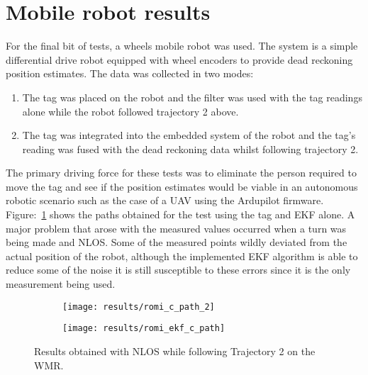 \section{Mobile robot results}\label{sec:mobile-robot-results}
For the final bit of tests, a wheels mobile robot was used.
The system is a simple differential drive robot equipped with wheel encoders to provide dead reckoning position estimates.
The data was collected in two modes:
\begin{enumerate}
    \item The tag was placed on the robot and the filter was used with the tag readings alone while the robot followed trajectory 2 above.
    \item The tag was integrated into the embedded system of the robot and the tag's reading was fused with the dead reckoning data whilst following trajectory 2.
\end{enumerate}
The primary driving force for these tests was to eliminate the person required to move the tag and see if the position estimates would be viable in an autonomous robotic scenario such as the case of a UAV using the Ardupilot firmware.
Figure:~\ref{fig:romi_nlos_1} shows the paths obtained for the test using the tag and EKF alone.
A major problem that arose with the measured values occurred when a turn was being made and NLOS.
Some of the measured points wildly deviated from the actual position of the robot, although the implemented EKF algorithm is able to reduce some of the noise it is still susceptible to these errors since it is the only measurement being used.
\begin{figure}[ht!]
    \centering
    \begin{subfigure}{0.7\textwidth}
            \texttt{[image: results/romi\_c\_path\_2]}
    \end{subfigure}
    \begin{subfigure}{0.7\textwidth}
            \texttt{[image: results/romi\_ekf\_c\_path]}
    \end{subfigure}
    \caption{Results obtained with NLOS while following Trajectory 2 on the WMR.}
    \label{fig:romi_nlos_1}
\end{figure}

